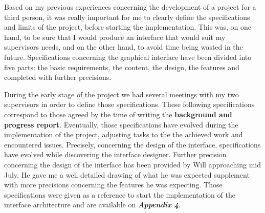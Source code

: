 Based on my previous experiences concerning the development of a project for a third person, it was really important for me to clearly define the specifications and limits of the project, before starting the implementation. This was, on one hand, to be sure that I would produce an interface that would suit my supervisors needs, and on the other hand, to avoid time being wasted in the future. Specifications concerning the graphical interface have been divided into five parts: the basic requirements, the content, the design, the features and completed with further precisions. 

\newline \vspace{5mm}

During the early stage of the project we had several meetings with my two supervisors in order to define those specifications. These following specifications correspond to those agreed by the time of writing the \textbf{background and progress report}. Eventually, those specifications have evolved during the implementation of the project, adjusting tasks to the the achieved work and encountered issues. Precisely, concerning the design of the interface, specifications have evolved while discovering the interface designer. Further precision concerning the design of the interface has been provided by Will approaching mid July. He gave me a well detailed drawing of what he was expected supplement with more precisions concerning the features he was expecting. Those specifications were given as a reference to start the implementation of the interface architecture and are available on \textbf{\textit{Appendix 4}}.

